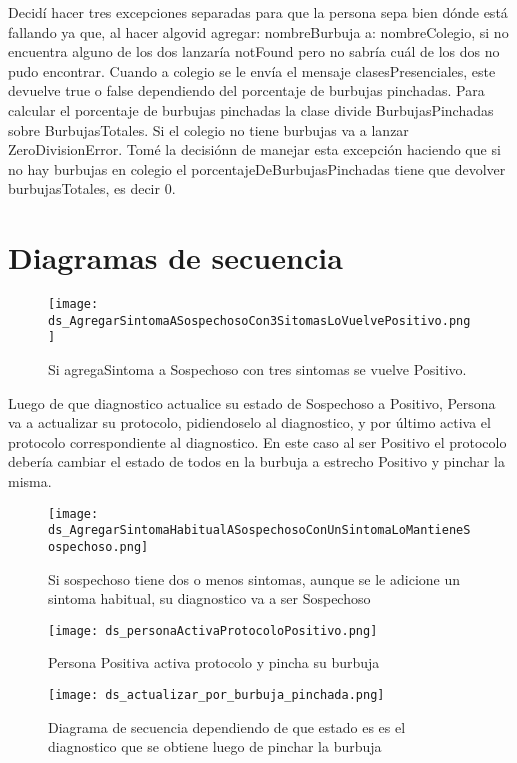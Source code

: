 \documentclass[titlepage,a4paper]{article}
\begin{document}
Decidí hacer tres excepciones separadas para que la persona sepa bien dónde está fallando ya que, al hacer algovid agregar: nombreBurbuja a: nombreColegio, si no encuentra alguno de los dos lanzaría notFound  pero no sabría cuál de los dos no pudo encontrar.
Cuando a colegio se le envía el mensaje clasesPresenciales, este devuelve true o false dependiendo del porcentaje de burbujas pinchadas. Para calcular el porcentaje de burbujas pinchadas la clase divide BurbujasPinchadas sobre BurbujasTotales. Si el colegio no tiene burbujas va a lanzar ZeroDivisionError. Tomé la decisiónn de manejar esta excepción haciendo que si no hay burbujas en colegio el porcentajeDeBurbujasPinchadas tiene que devolver burbujasTotales, es decir 0.


\section{Diagramas de secuencia}\label{sec:diagramasdesecuencia}
\begin{figure}[H]
\centering
\texttt{[image: ds\_AgregarSintomaASospechosoCon3SitomasLoVuelvePositivo.png]}
\caption{\label{fig:seq07}Si agregaSintoma a Sospechoso con tres sintomas se vuelve Positivo.}
\end{figure}

Luego de que diagnostico actualice su estado de Sospechoso a Positivo, Persona va a actualizar su protocolo, pidiendoselo al diagnostico, y por último activa el protocolo correspondiente al diagnostico.
En este caso al ser Positivo el protocolo debería cambiar el estado de todos en la burbuja a estrecho Positivo y pinchar la misma.


\begin{figure}[H]
\centering
\texttt{[image: ds\_AgregarSintomaHabitualASospechosoConUnSintomaLoMantieneSospechoso.png]}
\caption{\label{fig:seq08}Si sospechoso tiene dos o menos sintomas, aunque se le adicione un sintoma habitual, su diagnostico va a ser Sospechoso}
\end{figure}
\begin{figure}[H]
\centering
\texttt{[image: ds\_personaActivaProtocoloPositivo.png]}
\caption{\label{fig:seq09}Persona Positiva activa protocolo y pincha su burbuja}
\end{figure}

\begin{figure}[H]
\centering
\texttt{[image: ds\_actualizar\_por\_burbuja\_pinchada.png]}
\caption{\label{fig:seq10}Diagrama de secuencia dependiendo de que estado es es el diagnostico que se obtiene luego de pinchar la burbuja}
\end{figure}
\end{document}
